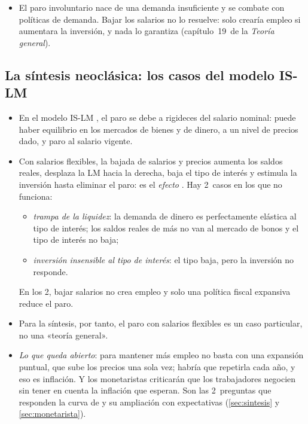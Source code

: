 \documentclass[11pt]{article}
\begin{document}
\begin{itemize}
\item El paro involuntario nace de una demanda insuficiente y se combate con políticas de demanda. Bajar los salarios no lo resuelve: solo crearía empleo si aumentara la inversión, y nada lo garantiza (capítulo~19~de la \emph{Teoría general}).
\end{itemize}

\subsection{La síntesis neoclásica: los casos del modelo IS-LM}\label{anexo:debate-islm}

\begin{itemize}
\item En el modelo IS-LM , el paro se debe a rigideces del salario nominal: puede haber equilibrio en los mercados de bienes y de dinero, a un nivel de precios dado, y paro al salario vigente.
\item Con salarios flexibles, la bajada de salarios y precios aumenta los saldos reales, desplaza la LM hacia la derecha, baja el tipo de interés y estimula la inversión hasta eliminar el paro: es el \emph{efecto }. Hay 2~casos en los que no funciona:
  \begin{itemize}
  \item \emph{trampa de la liquidez}: la demanda de dinero es perfectamente elástica al tipo de interés; los saldos reales de más no van al mercado de bonos y el tipo de interés no baja;
  \item \emph{inversión insensible al tipo de interés}: el tipo baja, pero la inversión no responde.
  \end{itemize}
  En los 2, bajar salarios no crea empleo y solo una política fiscal expansiva reduce el paro.
\item Para la síntesis, por tanto, el paro con salarios flexibles es un caso particular, no una «teoría general».
\item \emph{Lo que queda abierto}: para mantener más empleo no basta con una expansión puntual, que sube los precios una sola vez; habría que repetirla cada año, y eso es inflación. Y los monetaristas criticarán que los trabajadores negocien sin tener en cuenta la inflación que esperan. Son las 2~preguntas que responden la curva de  y su ampliación con expectativas (\ref{sec:sintesis} y \ref{sec:monetarista}).
\end{itemize}
\end{document}
